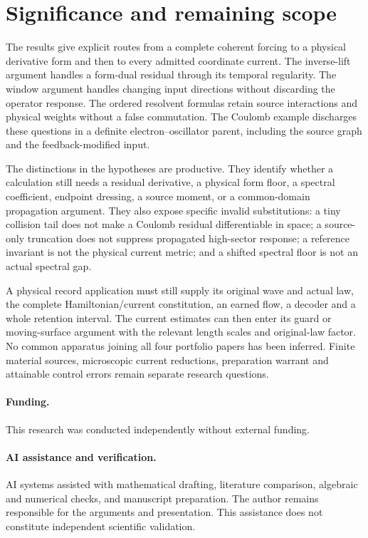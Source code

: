 \documentclass[11pt]{article}
\numberwithin{equation}{section}
\theoremstyle{definition}
\theoremstyle{remark}
\begin{document}
\section{Significance and remaining scope}
\label{p4s:sec:conclusion}

The results give explicit routes from a complete coherent forcing to a
physical derivative form and then to every admitted coordinate current.
The inverse-lift argument handles a form-dual residual through its
temporal regularity. The window argument handles changing input
directions without discarding the operator response. The ordered
resolvent formulas retain source interactions and physical weights
without a false commutation. The Coulomb example discharges these
questions in a definite electron--oscillator parent, including the
source graph and the feedback-modified input.

The distinctions in the hypotheses are productive. They identify
whether a calculation still needs a residual derivative, a physical
form floor, a spectral coefficient, endpoint dressing, a source
moment, or a common-domain propagation argument. They also expose
specific invalid substitutions: a tiny collision tail does not make a
Coulomb residual differentiable in space; a source-only truncation
does not suppress propagated high-sector response; a reference
invariant is not the physical current metric; and a shifted spectral
floor is not an actual spectral gap.

A physical record application must still supply its original wave and
actual law, the complete Hamiltonian/current constitution, an earned
flow, a decoder and a whole retention interval. The current estimates
can then enter its guard or moving-surface argument with the relevant
length scales and original-law factor. No common apparatus joining
all four portfolio papers has been inferred. Finite material sources,
microscopic current reductions, preparation warrant and attainable
control errors remain separate research questions.

\paragraph{Funding.}
This research was conducted independently without external funding.

\paragraph{AI assistance and verification.}
AI systems assisted with mathematical drafting, literature comparison,
algebraic and numerical checks, and manuscript preparation. The author
remains responsible for the arguments and presentation. This assistance
does not constitute independent scientific validation.
\end{document}
